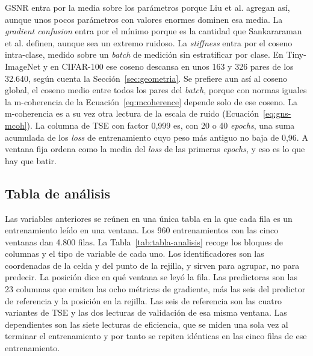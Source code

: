 GSNR entra por la media sobre los parámetros porque Liu et al. agregan así, aunque unos pocos parámetros con valores enormes dominen esa media. La \emph{gradient confusion} entra por el mínimo porque es la cantidad que Sankararaman et al. definen, aunque sea un extremo ruidoso. La \emph{stiffness} entra por el coseno intra-clase, medido sobre un \emph{batch} de medición sin estratificar por clase. En Tiny-ImageNet y en CIFAR-100 ese coseno descansa en unos 163 y 326 pares de los 32.640, según cuenta la Sección~\ref{sec:geometria}. Se prefiere aun así al coseno global, el coseno medio entre todos los pares del \emph{batch}, porque con normas iguales la m-coherencia de la Ecuación~\ref{eq:mcoherence} depende solo de ese coseno. La m-coherencia es a su vez otra lectura de la escala de ruido (Ecuación~\ref{eq:gns-mcoh}). La columna de TSE con factor 0,999 es, con 20 o 40 \emph{epochs}, una suma acumulada de los \emph{loss} de entrenamiento cuyo peso más antiguo no baja de 0,96. A ventana fija ordena como la media del \emph{loss} de las primeras \emph{epochs}, y eso es lo que hay que batir.

\subsection{Tabla de análisis}

Las variables anteriores se reúnen en una única tabla en la que cada fila es un entrenamiento leído en una ventana. Los 960 entrenamientos con las cinco ventanas dan 4.800 filas. La Tabla~\ref{tab:tabla-analisis} recoge los bloques de columnas y el tipo de variable de cada uno. Los identificadores son las coordenadas de la celda y del punto de la rejilla, y sirven para agrupar, no para predecir. La posición dice en qué ventana se leyó la fila. Las predictoras son las 23 columnas que emiten las ocho métricas de gradiente, más las seis del predictor de referencia y la posición en la rejilla. Las seis de referencia son las cuatro variantes de TSE y las dos lecturas de validación de esa misma ventana. Las dependientes son las siete lecturas de eficiencia, que se miden una sola vez al terminar el entrenamiento y por tanto se repiten idénticas en las cinco filas de ese entrenamiento.

